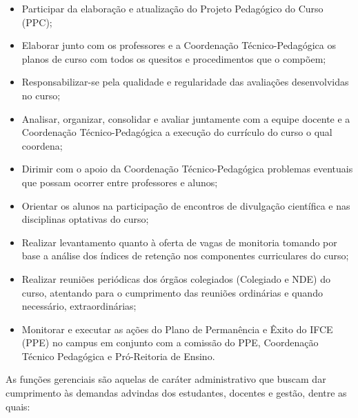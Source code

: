 \begin{itemize}
\item Participar da elaboração e atualização do Projeto Pedagógico do Curso (PPC);
\item Elaborar junto com os professores e a Coordenação Técnico-Pedagógica os planos de curso com todos os quesitos e procedimentos que o compõem;
\item Responsabilizar-se pela qualidade e regularidade das avaliações desenvolvidas no curso;
\item Analisar, organizar, consolidar e avaliar juntamente com a equipe docente e a Coordenação Técnico-Pedagógica a execução do currículo do curso o qual coordena;
\item Dirimir com o apoio da Coordenação Técnico-Pedagógica problemas eventuais que possam ocorrer entre professores e alunos;
\item Orientar os alunos na participação de encontros de divulgação científica e nas disciplinas optativas do curso;
\item Realizar levantamento quanto à oferta de vagas de monitoria tomando por base a análise dos índices de retenção nos componentes curriculares do curso;
\item Realizar reuniões periódicas dos órgãos colegiados (Colegiado e NDE) do curso, atentando para o cumprimento das reuniões ordinárias e quando necessário, extraordinárias;
\item Monitorar e executar as ações do Plano de Permanência e Êxito do IFCE (PPE) no campus em conjunto com a comissão do PPE, Coordenação Técnico Pedagógica e Pró-Reitoria de Ensino.

\end{itemize}

As funções gerenciais são aquelas de caráter administrativo que buscam dar cumprimento às demandas advindas dos estudantes, docentes e gestão, dentre as quais:\\

